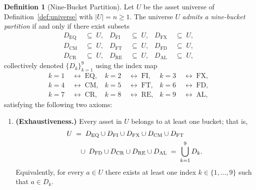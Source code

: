 \documentclass[12pt,openany]{book}
\newcommand{\calU}{\mathcal{U}}
\newcommand{\calD}{\mathcal{D}}
\numberwithin{equation}{chapter}
\theoremstyle{plain}
\theoremstyle{definition}
\newtheorem{definition}[theorem]{Definition}
\theoremstyle{remark}
\def\calU{U}%
\def\calD{D}%
\def\mathcal#1{#1}%
\begin{document}
\begin{definition}[Nine-Bucket Partition]
\label{def:buckets}
Let $\calU$ be the asset universe of Definition~\ref{def:universe}
with $|\calU| = n \geq 1$.
The universe $\calU$ \emph{admits a nine-bucket partition} if and only
if there exist subsets
\begin{align}
  \calD_{\mathrm{EQ}} &\;\subseteq\; \calU, &
  \calD_{\mathrm{FI}} &\;\subseteq\; \calU, &
  \calD_{\mathrm{FX}} &\;\subseteq\; \calU,
  \label{eq:bucket-subsets-row1} \\
  \calD_{\mathrm{CM}} &\;\subseteq\; \calU, &
  \calD_{\mathrm{FT}} &\;\subseteq\; \calU, &
  \calD_{\mathrm{FD}} &\;\subseteq\; \calU,
  \label{eq:bucket-subsets-row2} \\
  \calD_{\mathrm{CR}} &\;\subseteq\; \calU, &
  \calD_{\mathrm{RE}} &\;\subseteq\; \calU, &
  \calD_{\mathrm{AL}} &\;\subseteq\; \calU,
  \label{eq:bucket-subsets-row3}
\end{align}
collectively denoted $\{\calD_k\}_{k=1}^{9}$ using the index map
\begin{align}
  k=1 &\;\leftrightarrow\; \mathrm{EQ}, &
  k=2 &\;\leftrightarrow\; \mathrm{FI}, &
  k=3 &\;\leftrightarrow\; \mathrm{FX},
  \label{eq:index-map-row1} \\
  k=4 &\;\leftrightarrow\; \mathrm{CM}, &
  k=5 &\;\leftrightarrow\; \mathrm{FT}, &
  k=6 &\;\leftrightarrow\; \mathrm{FD},
  \label{eq:index-map-row2} \\
  k=7 &\;\leftrightarrow\; \mathrm{CR}, &
  k=8 &\;\leftrightarrow\; \mathrm{RE}, &
  k=9 &\;\leftrightarrow\; \mathrm{AL},
  \label{eq:index-map-row3}
\end{align}
satisfying the following two axioms:

\begin{enumerate}
  \item \textbf{(Exhaustiveness.)}
        Every asset in $\calU$ belongs to at least one bucket; that is,
        \begin{align}
          \calU
          &\;=\; \calD_{\mathrm{EQ}}
                 \cup \calD_{\mathrm{FI}}
                 \cup \calD_{\mathrm{FX}}
                 \cup \calD_{\mathrm{CM}}
                 \cup \calD_{\mathrm{FT}} \notag \\
          &\quad \cup\; \calD_{\mathrm{FD}}
                 \cup \calD_{\mathrm{CR}}
                 \cup \calD_{\mathrm{RE}}
                 \cup \calD_{\mathrm{AL}}
          \;=\; \bigcup_{k=1}^{9} \calD_k.
          \label{eq:exhaustiveness}
        \end{align}
        Equivalently, for every $a \in \calU$ there exists at least
        one index $k \in \{1,\ldots,9\}$ such that $a \in \calD_k$.


\end{enumerate}
\end{definition}
\end{document}
